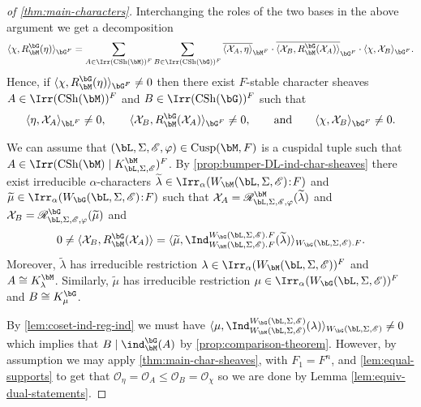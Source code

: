\documentclass[eqthmnum,nocolour,skinny]{jt-calcs}
\DeclareMathOperator{\CS}{CSh}
\DeclareMathOperator{\Cusp}{Cusp}
\newcommand\sd{
	\mathchoice{\mkern1.5mu}{\mkern1.5mu}{}{}%
	{:}%
	\mathchoice{\mkern1.5mu}{\mkern1.5mu}{}{}
}
\begin{document}
\begin{proof}[of \cref{thm:main-characters}]
Interchanging the roles of the two bases in the above argument we get a decomposition
\begin{equation*}
\langle \chi, R_{\bM}^{\bG}(\eta)\rangle_{\bG^F} = \sum_{A \in \Irr(\CS(\bM))^F}\sum_{B \in \Irr(\CS(\bG))^F} \overline{\langle \mathcal{X}_A,\eta\rangle}_{\bM^F} \cdot \overline{\langle \mathcal{X}_B, R_{\bM}^{\bG}(\mathcal{X}_A)\rangle}_{\bG^F} \cdot \langle \chi, \mathcal{X}_B\rangle_{\bG^F}.
\end{equation*}
Hence, if $\langle \chi, R_{\bM}^{\bG}(\eta)\rangle_{\bG^F} \neq 0$ then there exist $F$-stable character sheaves $A \in \Irr(\CS(\bM))^F$ and $B \in \Irr(\CS(\bG))^F$ such that
\begin{equation*}
\langle \eta, \mathcal{X}_A\rangle_{\bL^F} \neq 0, \qquad \langle \mathcal{X}_B, R_{\bM}^{\bG}(\mathcal{X}_A)\rangle_{\bG^F}\neq 0, \qquad\text{and}\qquad \langle \chi, \mathcal{X}_B\rangle_{\bG^F} \neq 0.
\end{equation*}

We can assume that $(\bL,\Sigma,\mathscr{E},\varphi) \in \Cusp(\bM,F)$ is a cuspidal tuple such that $A \in \Irr(\CS(\bM) \mid K_{\bL,\Sigma,\mathscr{E}}^{\bM})^F$. By \cref{prop:bumper-DL-ind-char-sheaves} there exist irreducible $\alpha$-characters $\widetilde{\lambda} \in \Irr_{\alpha}(W_{\bM}(\bL,\Sigma,\mathscr{E})\sd F)$ and $\widetilde{\mu} \in \Irr_{\alpha}(W_{\bG}(\bL,\Sigma,\mathscr{E})\sd F)$ such that $\mathcal{X}_A = \mathscr{R}_{\bL,\Sigma,\mathscr{E},\varphi}^{\bM}(\widetilde{\lambda})$ and $\mathcal{X}_B = \mathscr{R}_{\bL,\Sigma,\mathscr{E},\varphi}^{\bG}(\widetilde{\mu})$ and
\begin{equation*}
0 \neq \langle \mathcal{X}_B, R_{\bM}^{\bG}(\mathcal{X}_A)\rangle = \langle \widetilde{\mu}, \Ind_{W_{\bM}(\bL,\Sigma,\mathscr{E}).F}^{W_{\bG}(\bL,\Sigma,\mathscr{E}).F}(\widetilde{\lambda})\rangle_{W_{\bG}(\bL,\Sigma,\mathscr{E}).F}.
\end{equation*}
Moreover, $\widetilde{\lambda}$ has irreducible restriction $\lambda \in \Irr_{\alpha}(W_{\bM}(\bL,\Sigma,\mathscr{E}))^F$ and $A \cong K_{\lambda}^{\bM}$. Similarly, $\widetilde{\mu}$ has irreducible restriction $\mu \in \Irr_{\alpha}(W_{\bG}(\bL,\Sigma,\mathscr{E}))^F$ and $B \cong K_{\mu}^{\bG}$.

By \cref{lem:coset-ind-reg-ind} we must have $\langle \mu, \Ind_{W_{\bM}(\bL,\Sigma,\mathscr{E})}^{W_{\bG}(\bL,\Sigma,\mathscr{E})}(\lambda)\rangle_{W_{\bG}(\bL,\Sigma,\mathscr{E})} \neq 0$ which implies that $B \mid \ind_{\bM}^{\bG}(A)$ by \cref{prop:comparison-theorem}. However, by assumption we may apply \cref{thm:main-char-sheaves}, with $F_1 = F^n$, and \cref{lem:equal-supports} to get that $\mathcal{O}_{\eta} = \mathcal{O}_A \leqslant \mathcal{O}_B = \mathcal{O}_{\chi}$ so we are done by Lemma \ref{lem:equiv-dual-statements}.
\end{proof}
\end{document}
